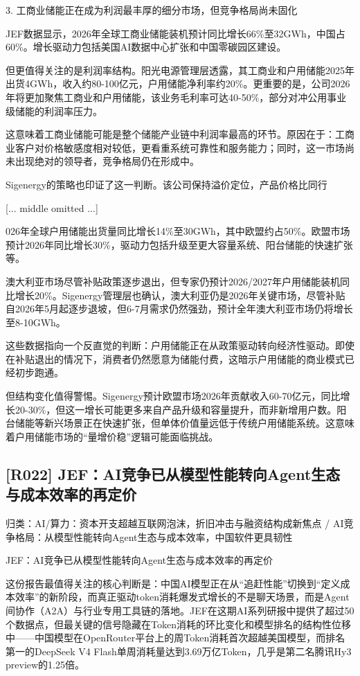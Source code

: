 \documentclass[11pt]{ctexart}
\begin{document}
3. 工商业储能正在成为利润最丰厚的细分市场，但竞争格局尚未固化

JEF数据显示，2026年全球工商业储能装机预计同比增长66\%至32GWh，中国占60\%。增长驱动力包括美国AI数据中心扩张和中国零碳园区建设。

但更值得关注的是利润率结构。阳光电源管理层透露，其工商业和户用储能2025年出货4GWh，收入约80-100亿元，户用储能净利率约20\%。更重要的是，公司2026年将更加聚焦工商业和户用储能，该业务毛利率可达40-50\%，部分对冲公用事业级储能的利润率压力。

这意味着工商业储能可能是整个储能产业链中利润率最高的环节。原因在于：工商业客户对价格敏感度相对较低，更看重系统可靠性和服务能力；同时，这一市场尚未出现绝对的领导者，竞争格局仍在形成中。

Sigenergy的策略也印证了这一判断。该公司保持溢价定位，产品价格比同行

[... middle omitted ...]

026年全球户用储能出货量同比增长14\%至30GWh，其中欧盟约占50\%。欧盟市场预计2026年同比增长30\%，驱动力包括升级至更大容量系统、阳台储能的快速扩张等。

澳大利亚市场尽管补贴政策逐步退出，但专家仍预计2026/2027年户用储能装机同比增长20\%。Sigenergy管理层也确认，澳大利亚仍是2026年关键市场，尽管补贴自2026年5月起逐步退坡，但6-7月需求仍然强劲，预计全年澳大利亚市场仍将增长至8-10GWh。

这些数据指向一个反直觉的判断：户用储能正在从政策驱动转向经济性驱动。即使在补贴退出的情况下，消费者仍然愿意为储能付费，这暗示户用储能的商业模式已经初步跑通。

但结构变化值得警惕。Sigenergy预计欧盟市场2026年贡献收入60-70亿元，同比增长20-30\%，但这一增长可能更多来自产品升级和容量提升，而非新增用户数。阳台储能等新兴场景正在快速扩张，但单体价值量远低于传统户用储能系统。这意味着户用储能市场的“量增价稳”逻辑可能面临挑战。

\subsection{[R022] JEF：AI竞争已从模型性能转向Agent生态与成本效率的再定价}
{\small\color{refgray}归类：AI/算力：资本开支超越互联网泡沫，折旧冲击与融资结构成新焦点 / AI竞争格局：从模型性能转向Agent生态与成本效率，中国软件更具韧性}

JEF：AI竞争已从模型性能转向Agent生态与成本效率的再定价

这份报告最值得关注的核心判断是：中国AI模型正在从“追赶性能”切换到“定义成本效率”的新阶段，而真正驱动token消耗爆发式增长的不是聊天场景，而是Agent间协作（A2A）与行业专用工具链的落地。JEF在这期AI系列研报中提供了超过50个数据点，但最关键的信号隐藏在Token消耗的环比变化和模型排名的结构性位移中——中国模型在OpenRouter平台上的周Token消耗首次超越美国模型，而排名第一的DeepSeek V4 Flash单周消耗量达到3.69万亿Token，几乎是第二名腾讯Hy3 preview的1.25倍。
\end{document}
